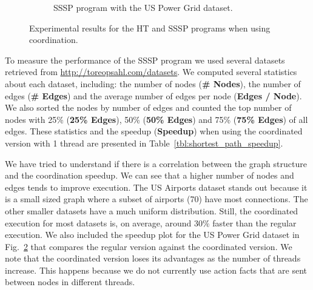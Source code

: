 \begin{figure}[h!]
\begin{subfigure}[b]{0.4\textwidth}
      \caption{SSSP program with the US Power Grid dataset.}\label{exp:sssp-uspowergrid}
   \end{subfigure}
   \caption{Experimental results for the HT and SSSP programs when using coordination.}
\end{figure}

To measure the performance of the SSSP program we used several datasets retrieved from \url{http://toreopsahl.com/datasets}. We computed several
statistics about each dataset, including: the number of nodes (\textbf{\# Nodes}), the number of edges (\textbf{\# Edges}) and
the average number of edges per node (\textbf{Edges / Node}). We also sorted the nodes by number of edges and counted the top number of nodes
with 25\% (\textbf{25\% Edges}), 50\% (\textbf{50\% Edges}) and 75\% (\textbf{75\% Edges}) of all edges.
These statistics and the speedup (\textbf{Speedup}) when using the coordinated version with 1 thread are presented in Table~\ref{tbl:shortest_path_speedup}.

We have tried to understand if there is a correlation between the graph structure and the coordination speedup. We can see that a higher number
of nodes and edges tends to improve execution. The US Airports dataset stands out because it is a small sized graph where a subset of airports
(70) have most connections. The other smaller datasets have a much uniform distribution.
Still, the coordinated execution for most datasets is, on average, around 30\% faster than the regular execution. We also included the speedup plot
for the US Power Grid dataset in Fig.~\ref{exp:sssp-uspowergrid} that compares the regular version against the coordinated version.
We note that the coordinated version loses its advantages as the number of threads increase. This happens because we do not
currently use action facts that are sent between nodes in different threads.

